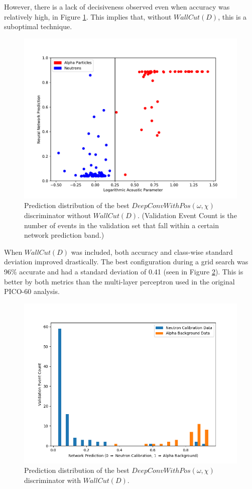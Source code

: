 \documentclass[10pt]{article}
\begin{document}
However, there is a lack of decisiveness observed even when accuracy was relatively high, in Figure \ref{waveform_hist}. This implies that, without $WallCut(D)$, this is a suboptimal technique.

\begin{figure}[H]
    \centering
    \includegraphics[width=\textwidth]{waveform_hist}
    \caption{\label{waveform_hist} Prediction distribution of the best $DeepConvWithPos(\omega, \chi)$ discriminator without $WallCut(D)$. (Validation Event Count is the number of events in the validation set that fall within a certain network prediction band.)}
\end{figure}

When $WallCut(D)$ was included, both accuracy and class-wise standard deviation improved drastically. The best configuration during a grid search was 96\% accurate and had a standard deviation of 0.41 (seen in Figure \ref{waveform_wall_cut_hist}). This is better by both metrics than the multi-layer perceptron used in the original PICO-60 analysis.

\begin{figure}[H]
    \centering
    \includegraphics[width=\textwidth]{waveform_wall_cut_hist}
    \caption{\label{waveform_wall_cut_hist} Prediction distribution of the best $DeepConvWithPos(\omega, \chi)$ discriminator with $WallCut(D)$.}
\end{figure}
\end{document}
